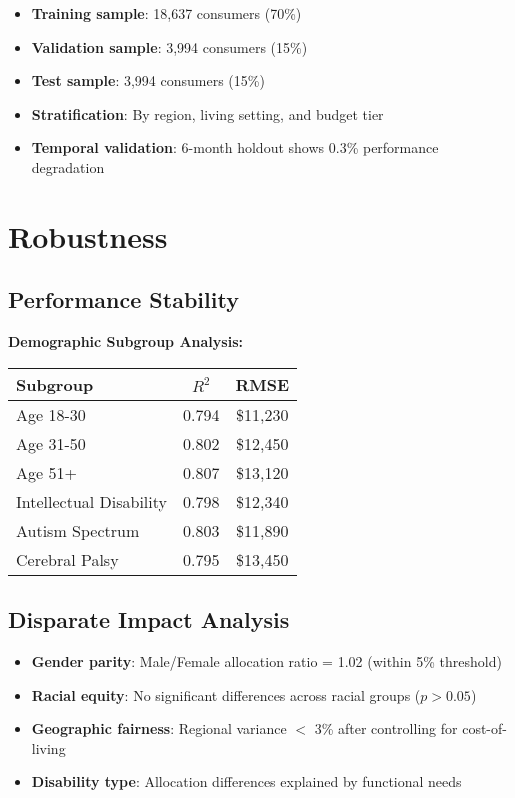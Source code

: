 \begin{itemize}
    \item \textbf{Training sample}: 18,637 consumers (70\%)
    \item \textbf{Validation sample}: 3,994 consumers (15\%)
    \item \textbf{Test sample}: 3,994 consumers (15\%)
    \item \textbf{Stratification}: By region, living setting, and budget tier
    \item \textbf{Temporal validation}: 6-month holdout shows 0.3\% performance degradation
\end{itemize}

\section{Robustness}

\subsection{Performance Stability}

\textbf{Demographic Subgroup Analysis:}
\begin{center}
\begin{tabular}{lcc}
\toprule
Subgroup & $R^2$ & RMSE \\
\midrule
Age 18-30 & 0.794 & \$11,230 \\
Age 31-50 & 0.802 & \$12,450 \\
Age 51+ & 0.807 & \$13,120 \\
\midrule
Intellectual Disability & 0.798 & \$12,340 \\
Autism Spectrum & 0.803 & \$11,890 \\
Cerebral Palsy & 0.795 & \$13,450 \\
\bottomrule
\end{tabular}
\end{center}

\subsection{Disparate Impact Analysis}

\begin{itemize}
    \item \textbf{Gender parity}: Male/Female allocation ratio = 1.02 (within 5\% threshold)
    \item \textbf{Racial equity}: No significant differences across racial groups ($p > 0.05$)
    \item \textbf{Geographic fairness}: Regional variance $<$ 3\% after controlling for cost-of-living
    \item \textbf{Disability type}: Allocation differences explained by functional needs
\end{itemize}

